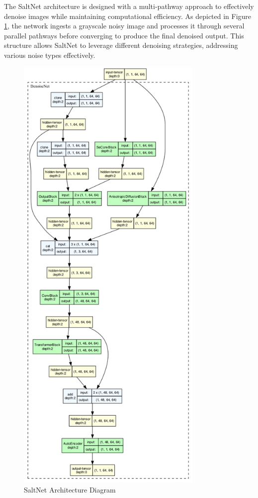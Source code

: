 The SaltNet architecture is designed with a multi-pathway approach to effectively denoise images while maintaining computational efficiency. As depicted in Figure \ref{fig:saltnet_architecture}, the network ingests a grayscale noisy image and processes it through several parallel pathways before converging to produce the final denoised output. This structure allows SaltNet to leverage different denoising strategies, addressing various noise types effectively.

\begin{figure}[h]
    \centering
    \includegraphics[width=0.8\textwidth]{assets/network_architecture.png}
    \caption{SaltNet Architecture Diagram}
    \label{fig:saltnet_architecture}
\end{figure}

